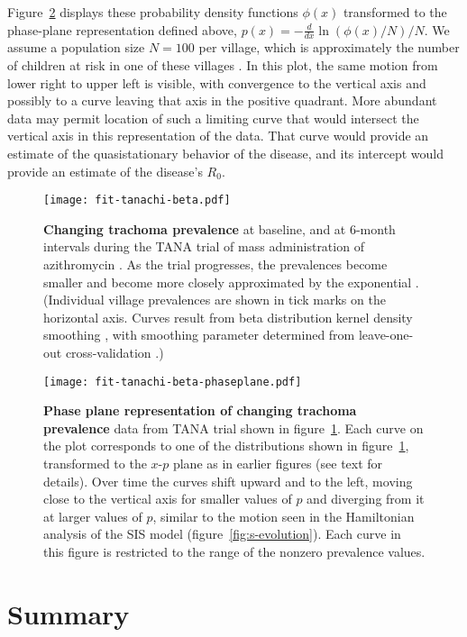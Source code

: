\documentclass[review]{elsarticle}
\begin{document}
Figure~\ref{fig:tana-phaseplane} displays these probability
density functions $\phi(x)$
transformed to the phase-plane representation
defined above, $p(x) = -\frac{d}{dx}\ln(\phi(x)/N)/N$.
We assume a population size $N=100$ per village,
which is approximately the number of children at risk in
one of these villages
\cite{Gebre2012}.
In this plot, the same motion from lower right to upper left is
visible, with convergence to the vertical axis and possibly to
a curve leaving that axis in the positive quadrant.
More abundant data may permit location of such
a limiting curve that would intersect the vertical axis in this
representation of the data.
That curve would provide an estimate of the quasistationary behavior of
the disease, and its intercept would provide an estimate of the
disease's $R_0$.

\begin{figure}
\centering
\texttt{[image: fit-tanachi-beta.pdf]}
\caption{ \label{fig:tana-density}
{\bf Changing trachoma prevalence} at baseline, and at 6-month intervals
during the TANA
trial of mass administration of azithromycin
\cite{Gebre2012}.
As the trial progresses, the prevalences become smaller
and become more closely approximated by the exponential 
\cite{lietman-gebre-abdou2015}.
(Individual village prevalences are shown in tick marks on the horizontal
axis. Curves result from beta distribution kernel density smoothing
\cite{chen1999beta},
with smoothing parameter determined from leave-one-out cross-validation
\cite{burnham1998model}.)
}
\end{figure}

\begin{figure}
\centering
\texttt{[image: fit-tanachi-beta-phaseplane.pdf]}
\caption{ \label{fig:tana-phaseplane}
{\bf Phase plane representation of changing trachoma prevalence}
data from TANA trial shown in figure~\ref{fig:tana-density}.
Each curve on the plot corresponds to one of the distributions
shown in figure~\ref{fig:tana-density},
transformed to the $x$-$p$ plane as in earlier figures
(see text for details).
Over time the curves shift upward and to the left,
moving close to the vertical axis for smaller values of $p$
and diverging from it at larger values of $p$,
similar to the motion seen in the Hamiltonian analysis of
the SIS model (figure~\ref{fig:s-evolution}).
Each curve in this figure is restricted to the range of the nonzero
prevalence values.
}
\end{figure}

\section{Summary}
\end{document}
